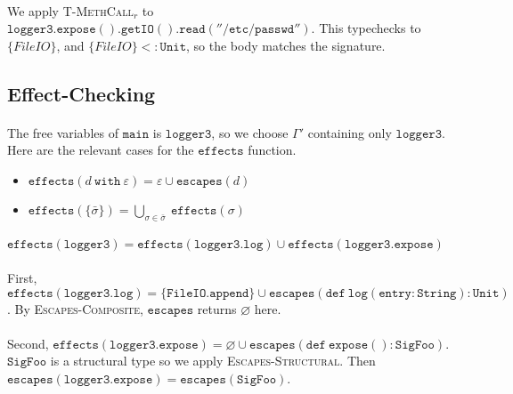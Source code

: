 \documentclass{llncs}
\newcommand{\keywadj}[1]{\mathtt{#1}}
\newcommand{\keyw}[1]{\keywadj{#1}~}
\begin{document}
\paragraph{}
We apply \textsc{T-MethCall$_r$} to $\keywadj{logger3.expose().getIO().read(''/etc/passwd'')}$. This typechecks to $\{ FileIO \}$, and $\{ FileIO \} <: \keywadj{Unit}$, so the body matches the signature.

\subsection*{Effect-Checking}

\paragraph{}
The free variables of $\keywadj{main}$ is $\keywadj{logger3}$, so we choose $\Gamma'$ containing only $\keywadj{logger3}$. Here are the relevant cases for the $\keywadj{effects}$ function.

\begin{itemize}
	\item $\keywadj{effects}(d~\keyw{with} \varepsilon) = \varepsilon \cup \keywadj{escapes}(d)$
	\item $\keywadj{effects}(\{\bar \sigma\}) = \bigcup_{\sigma \in \bar \sigma}~\keywadj{effects}(\sigma)$
\end{itemize}

\paragraph{}
$\keywadj{effects(logger3) = effects(logger3.log) \cup effects(logger3.expose)}$

\paragraph{}
First, $\keywadj{effects(logger3.log) = \{ FileIO.append \} \cup escapes(def~log(entry : String) : Unit)}$. By \textsc{Escapes-Composite}, $\keywadj{escapes}$ returns $\varnothing$ here.

\paragraph{}
Second, $\keywadj{effects(logger3.expose) = \varnothing \cup escapes(def~expose() : SigFoo)}$. $\keywadj{SigFoo}$ is a structural type so we apply \textsc{Escapes-Structural}. Then $\keywadj{escapes(logger3.expose) = escapes(SigFoo)}$.
\end{document}
